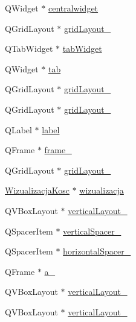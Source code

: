 \begin{DoxyCompactItemize}
\item 
Q\+Widget $\ast$ \hyperlink{class_ui___main_window_a356f1cf3ebda15f1fac59467ee081b74}{centralwidget}
\item 
Q\+Grid\+Layout $\ast$ \hyperlink{class_ui___main_window_a79b264e6945e3b94a511427b1c270dd7}{grid\+Layout\+\_}
\item 
Q\+Tab\+Widget $\ast$ \hyperlink{class_ui___main_window_a3260b943854b841c986f47c4726ee7f9}{tab\+Widget}
\item 
Q\+Widget $\ast$ \hyperlink{class_ui___main_window_a3efc28c664e9f5115095aafbbc5ac6bc}{tab}
\item 
Q\+Grid\+Layout $\ast$ \hyperlink{class_ui___main_window_a1482572d55e80324ebb4a9e53c0120e3}{grid\+Layout\+\_}
\item 
Q\+Grid\+Layout $\ast$ \hyperlink{class_ui___main_window_a0bdc0d6ee9d3d95f58c53d84871f82b9}{grid\+Layout\+\_}
\item 
Q\+Label $\ast$ \hyperlink{class_ui___main_window_ad9c89133780f28e6efa2ec17ceb9cff5}{label}
\item 
Q\+Frame $\ast$ \hyperlink{class_ui___main_window_ab47865bd12cd980e143b3fc06ad24ac1}{frame\+\_}
\item 
Q\+Grid\+Layout $\ast$ \hyperlink{class_ui___main_window_af42ea7d4c2e893181caad21e28166932}{grid\+Layout\+\_}
\item 
\hyperlink{class_wizualizacja_kosc}{Wizualizacja\+Kosc} $\ast$ \hyperlink{class_ui___main_window_ad718dc71d168fd759d27806468beb381}{wizualizacja}
\item 
Q\+V\+Box\+Layout $\ast$ \hyperlink{class_ui___main_window_a93c190b085c63a667c535ba0bbcfec7c}{vertical\+Layout\+\_}
\item 
Q\+Spacer\+Item $\ast$ \hyperlink{class_ui___main_window_a298e82ba0cc2500cd61f393f493e4529}{vertical\+Spacer\+\_}
\item 
Q\+Spacer\+Item $\ast$ \hyperlink{class_ui___main_window_a9a022556cf8ce3fa47e51d79cb222ab0}{horizontal\+Spacer\+\_}
\item 
Q\+Frame $\ast$ \hyperlink{class_ui___main_window_afb86e28eb82b9b69086f5a5e48175638}{a\+\_}
\item 
Q\+V\+Box\+Layout $\ast$ \hyperlink{class_ui___main_window_a04ce3ef61cc4b4fb628b2a258275f5ef}{vertical\+Layout\+\_}
\item 
Q\+V\+Box\+Layout $\ast$ \hyperlink{class_ui___main_window_a8cf1c6ec21e85d25d8ff8cfc84652568}{vertical\+Layout\+\_}
\item 

\end{DoxyCompactItemize}
